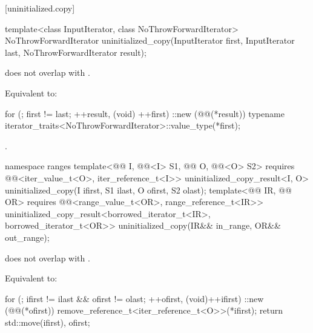 [uninitialized.copy]{}

%
\begin{itemdecl}
template<class InputIterator, class NoThrowForwardIterator>
  NoThrowForwardIterator uninitialized_copy(InputIterator first, InputIterator last,
                                            NoThrowForwardIterator result);
\end{itemdecl}

\begin{itemdescr}
\pnum
\expects
{} does not overlap with .

\pnum
\effects
Equivalent to:
\begin{codeblock}
for (; first != last; ++result, (void) ++first)
  ::new (@@(*result))
    typename iterator_traits<NoThrowForwardIterator>::value_type(*first);
\end{codeblock}

\pnum
\returns
{}.
\end{itemdescr}

%
\begin{itemdecl}
namespace ranges {
  template<@@ I, @@<I> S1,
           @@ O, @@<O> S2>
    requires @@<iter_value_t<O>, iter_reference_t<I>>
    uninitialized_copy_result<I, O>
      uninitialized_copy(I ifirst, S1 ilast, O ofirst, S2 olast);
  template<@@ IR, @@ OR>
    requires @@<range_value_t<OR>, range_reference_t<IR>>
    uninitialized_copy_result<borrowed_iterator_t<IR>, borrowed_iterator_t<OR>>
      uninitialized_copy(IR&& in_range, OR&& out_range);
}
\end{itemdecl}

\begin{itemdescr}
\pnum
\expects
{} does not overlap with .

\pnum
\effects
Equivalent to:
\begin{codeblock}
for (; ifirst != ilast && ofirst != olast; ++ofirst, (void)++ifirst)
  ::new (@@(*ofirst)) remove_reference_t<iter_reference_t<O>>(*ifirst);
return {std::move(ifirst), ofirst};
\end{codeblock}
\end{itemdescr}


